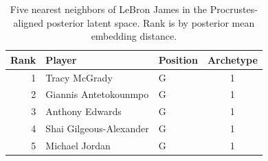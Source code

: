\begin{table}[htbp]
  \centering\small
  \begin{tabular}{rllc}
    \toprule
    Rank & Player & Position & Archetype \\
    \midrule
    1 & Tracy McGrady & G & 1 \\
    2 & Giannis Antetokounmpo & G & 1 \\
    3 & Anthony Edwards & G & 1 \\
    4 & Shai Gilgeous-Alexander & G & 1 \\
    5 & Michael Jordan & G & 1 \\
    \bottomrule
  \end{tabular}
  \caption{Five nearest neighbors of LeBron James in the Procrustes-aligned posterior latent space. Rank is by posterior mean embedding distance.}
  \label{tab:LeBron_James_neighbors}
\end{table}

